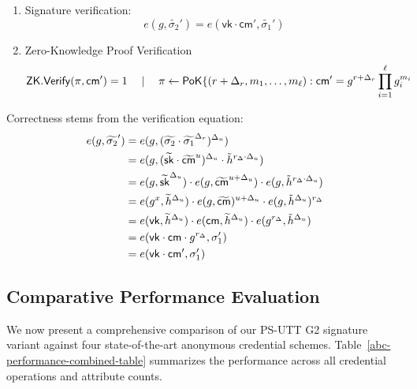 \begin{enumerate}
    \item Signature verification:
    \[
    e(g, \widetilde{\sigma_2}') = e(\mathsf{vk} \cdot \mathsf{cm}',\widetilde{\sigma_1}')
    \]
    \item Zero-Knowledge Proof Verification
    \[
    \mathsf{ZK.Verify}(\pi, \mathsf{cm}') = 1 \quad \mid \quad \pi \gets \mathsf{PoK}\{(r + \Delta_r, m_1,\ldots,m_\ell): \mathsf{cm}' = g^{r + \Delta_r} \prod_{i=1}^\ell g_i^{m_i}
    \]
\end{enumerate}

Correctness stems from the verification equation:
    \begin{align*}
        e(g, \widetilde{\sigma_2}') &= e(g, (\widetilde{\sigma_2} \cdot \widetilde{\sigma_1}^{\Delta_r})^{\Delta_u}) \\
        &= e(g, (\widetilde{\mathsf{sk}} \cdot \widetilde{\mathsf{cm}}^{u})^{\Delta_u} \cdot \tilde{h}^{r_{\Delta} \cdot \Delta_u}) \\
        &= e(g, \widetilde{\mathsf{sk}}^{\Delta_u}) \cdot e(g, \widetilde{\mathsf{cm}}^{u + \Delta_u}) \cdot e(g,\tilde{h}^{r_{\Delta} \cdot \Delta_u}) \\
        &= e(g^x, \widetilde{h}^{\Delta_u}) \cdot e(g, \widetilde{\mathsf{cm}})^{u + \Delta_u} \cdot e(g,\tilde{h}^{\Delta_u})^{r_{\Delta}} \\
        &= e(\mathsf{vk}, \widetilde{h}^{\Delta_u}) \cdot e(\mathsf{cm}, \widetilde{h}^{\Delta_u}) \cdot e(g^{r_{\Delta}},\tilde{h}^{\Delta_u}) \\
        &= e(\mathsf{vk} \cdot \mathsf{cm} \cdot g^{r_{\Delta}}, \sigma_1')  \\
        &= e(\mathsf{vk} \cdot \mathsf{cm}', \sigma_1')  \\
    \end{align*}




\subsection{Comparative Performance Evaluation}

We now present a comprehensive comparison of our PS-UTT G2 signature variant against four state-of-the-art anonymous credential schemes. Table~\ref{abc-performance-combined-table} summarizes the performance across all credential operations and attribute counts.


